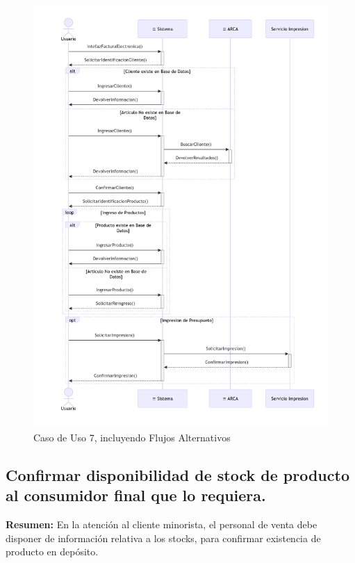 \begin{figure}[H]
	\centering
	\vspace{15pt}
	\caption{Caso de Uso 7, incluyendo Flujos Alternativos}
	\vspace{15pt}
	\includegraphics[width=.95\textwidth]{img/04-diagrama-caso-7.png}
	\vspace{15pt}
\end{figure}

\pagebreak

\subsection{Confirmar disponibilidad de stock de producto al consumidor final que lo requiera.}

\textbf{Resumen:}
En la atención al cliente minorista,
el personal de venta debe disponer de información relativa a los stocks,
para confirmar existencia de producto en depósito.

